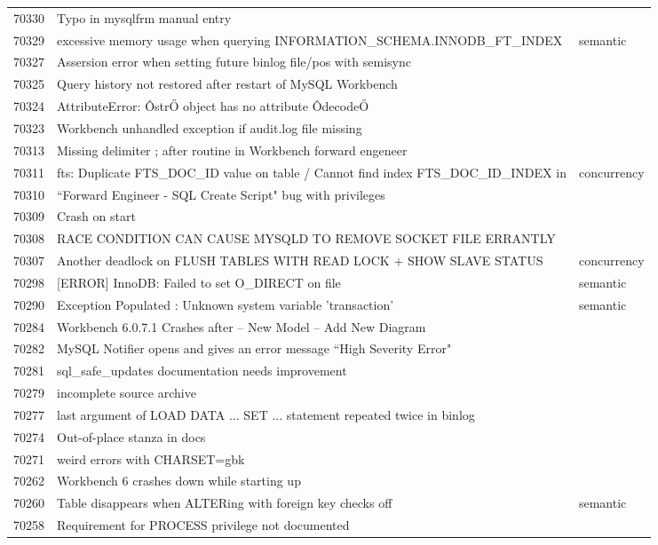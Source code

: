 \begin{longtable}[c]{p{1cm}p{10cm}p{1cm}}
70330 & Typo in mysqlfrm manual entry &  \\
70329 & excessive memory usage when querying INFORMATION\_SCHEMA.INNODB\_FT\_INDEX & semantic \\
70327 & Assersion error when setting future binlog file/pos with semisync &  \\
70325 & Query history not restored after restart of MySQL Workbench &  \\
70324 & AttributeError: ÔstrŐ object has no attribute ÔdecodeŐ &  \\
70323 & Workbench unhandled exception if audit.log file missing &  \\
70313 & Missing delimiter ; after routine in Workbench forward engeneer &  \\
70311 & fts: Duplicate FTS\_DOC\_ID value on table / Cannot find index FTS\_DOC\_ID\_INDEX in & concurrency \\
70310 & ``Forward Engineer - SQL Create Script" bug with privileges &  \\
70309 & Crash on start &  \\
70308 & RACE CONDITION CAN CAUSE MYSQLD TO REMOVE SOCKET FILE ERRANTLY &  \\
70307 & Another deadlock on FLUSH TABLES WITH READ LOCK + SHOW SLAVE STATUS & concurrency \\
70298 & {[}ERROR{]} InnoDB: Failed to set O\_DIRECT on file & semantic \\
70290 & Exception Populated : Unknown system variable 'transaction' & semantic \\
70284 & Workbench 6.0.7.1 Crashes after -- New Model -- Add New Diagram &  \\
70282 & MySQL Notifier opens and gives an error message ``High Severity Error" &  \\
70281 & sql\_safe\_updates documentation needs improvement &  \\
70279 & incomplete source archive &  \\
70277 & last argument of LOAD DATA ... SET ... statement repeated twice in binlog &  \\
70274 & Out-of-place stanza in docs &  \\
70271 & weird errors with CHARSET=gbk &  \\
70262 & Workbench 6 crashes down while starting up &  \\
70260 & Table disappears when ALTERing with foreign key checks off & semantic \\
70258 & Requirement for PROCESS privilege not documented &  \\

\end{longtable}
